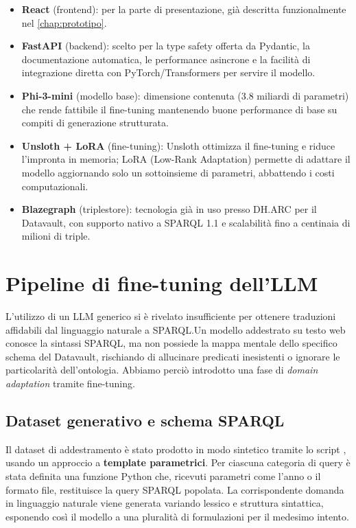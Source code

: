     \begin{itemize}
      \item \textbf{React} (frontend): per la parte di presentazione, già descritta funzionalmente nel \cref{chap:prototipo}.
      \item \textbf{FastAPI} (backend): scelto per la type safety offerta da Pydantic, la documentazione automatica, le performance asincrone e la facilità di integrazione diretta con PyTorch/Transformers per servire il modello.
      \item \textbf{Phi-3-mini} (modello base): dimensione contenuta (3.8 miliardi di parametri) che rende fattibile il fine-tuning mantenendo buone performance di base su compiti di generazione strutturata.
      \item \textbf{Unsloth + LoRA} (fine-tuning): Unsloth ottimizza il fine-tuning e riduce l'impronta in memoria; LoRA (Low-Rank Adaptation) permette di adattare il modello aggiornando solo un sottoinsieme di parametri, abbattendo i costi computazionali.
      \item \textbf{Blazegraph} (triplestore): tecnologia già in uso presso DH.ARC per il Datavault, con supporto nativo a SPARQL 1.1 e scalabilità fino a centinaia di milioni di triple.
    \end{itemize}


\section{Pipeline di fine-tuning dell'LLM}\label{sec:finetuning}
  L'utilizzo di un LLM generico si è rivelato insufficiente per ottenere traduzioni affidabili dal linguaggio naturale a SPARQL.\@ Un modello addestrato su testo web conosce la sintassi SPARQL, ma non possiede la mappa mentale dello specifico schema del Datavault, rischiando di allucinare predicati inesistenti o ignorare le particolarità dell'ontologia. Abbiamo perciò introdotto una fase di \textit{domain adaptation} tramite fine-tuning.

  \subsection{Dataset generativo e schema SPARQL}\label{subsec:dataset_gen}
    Il dataset di addestramento è stato prodotto in modo sintetico tramite lo script , usando un approccio a \textbf{template parametrici}. Per ciascuna categoria di query è stata definita una funzione Python che, ricevuti parametri come l'anno o il formato file, restituisce la query SPARQL popolata. 
    La corrispondente domanda in linguaggio naturale viene generata variando lessico e struttura sintattica, esponendo così il modello a una pluralità di formulazioni per il medesimo intento.

